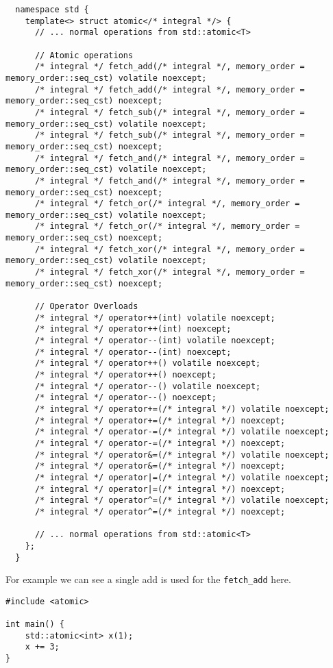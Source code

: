 \begin{verbatim}
  namespace std {
    template<> struct atomic</* integral */> {
      // ... normal operations from std::atomic<T>

      // Atomic operations
      /* integral */ fetch_add(/* integral */, memory_order = memory_order::seq_cst) volatile noexcept;
      /* integral */ fetch_add(/* integral */, memory_order = memory_order::seq_cst) noexcept;
      /* integral */ fetch_sub(/* integral */, memory_order = memory_order::seq_cst) volatile noexcept;
      /* integral */ fetch_sub(/* integral */, memory_order = memory_order::seq_cst) noexcept;
      /* integral */ fetch_and(/* integral */, memory_order = memory_order::seq_cst) volatile noexcept;
      /* integral */ fetch_and(/* integral */, memory_order = memory_order::seq_cst) noexcept;
      /* integral */ fetch_or(/* integral */, memory_order = memory_order::seq_cst) volatile noexcept;
      /* integral */ fetch_or(/* integral */, memory_order = memory_order::seq_cst) noexcept;
      /* integral */ fetch_xor(/* integral */, memory_order = memory_order::seq_cst) volatile noexcept;
      /* integral */ fetch_xor(/* integral */, memory_order = memory_order::seq_cst) noexcept;

      // Operator Overloads
      /* integral */ operator++(int) volatile noexcept;
      /* integral */ operator++(int) noexcept;
      /* integral */ operator--(int) volatile noexcept;
      /* integral */ operator--(int) noexcept;
      /* integral */ operator++() volatile noexcept;
      /* integral */ operator++() noexcept;
      /* integral */ operator--() volatile noexcept;
      /* integral */ operator--() noexcept;
      /* integral */ operator+=(/* integral */) volatile noexcept;
      /* integral */ operator+=(/* integral */) noexcept;
      /* integral */ operator-=(/* integral */) volatile noexcept;
      /* integral */ operator-=(/* integral */) noexcept;
      /* integral */ operator&=(/* integral */) volatile noexcept;
      /* integral */ operator&=(/* integral */) noexcept;
      /* integral */ operator|=(/* integral */) volatile noexcept;
      /* integral */ operator|=(/* integral */) noexcept;
      /* integral */ operator^=(/* integral */) volatile noexcept;
      /* integral */ operator^=(/* integral */) noexcept;

      // ... normal operations from std::atomic<T>
    };
  }
\end{verbatim}
For example we can see a single add is used for the \texttt{fetch_add} here.
\\ \begin{minipage}{.49\textwidth}
	\begin{verbatim}
#include <atomic>

int main() {
    std::atomic<int> x(1);
    x += 3;
}
  \end{verbatim}
\end{minipage}
